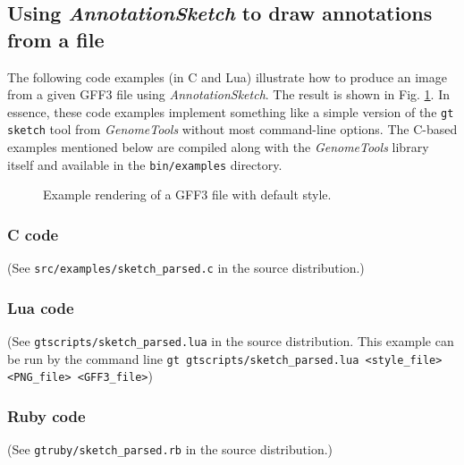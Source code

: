 \documentclass[a4paper]{scrreprt}
\begin{document}
\subsection{Using \emph{AnnotationSketch} to draw annotations from a file}
The following code examples (in C and Lua) illustrate how to produce an image from a given GFF3 file using \emph{AnnotationSketch}. The result is shown in Fig. \ref{parsed_img}. In essence, these code examples implement something like a simple version of the \texttt{gt sketch} tool from \emph{GenomeTools} without most command-line options. The C-based examples mentioned below are compiled along with the \emph{GenomeTools} library itself and available in the \texttt{bin/examples} directory.

\begin{figure}
\caption{Example rendering of a GFF3 file with default style.}
\label{parsed_img}
\end{figure}

\subsubsection{C code}
(See \texttt{src/examples/sketch\_parsed.c} in the source distribution.)

\subsubsection{Lua code}
(See \texttt{gtscripts/sketch\_parsed.lua} in the source distribution. This example can be run by the command line \texttt{gt gtscripts/sketch\_parsed.lua <style\_file> <PNG\_file> <GFF3\_file>})

\subsubsection{Ruby code}
(See \texttt{gtruby/sketch\_parsed.rb} in the source distribution.)

\end{document}
